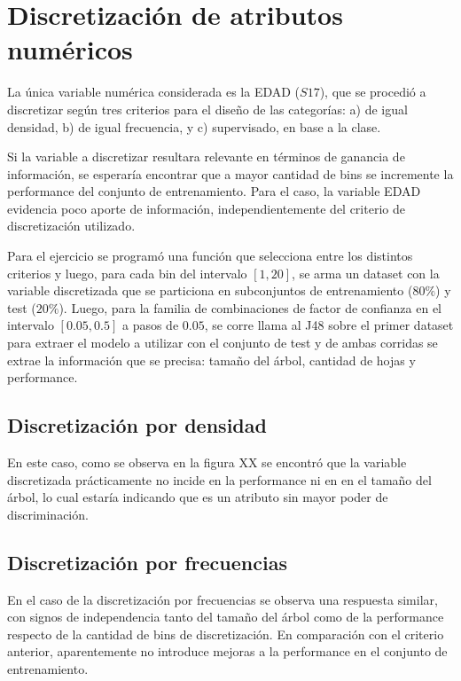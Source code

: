 \documentclass[]{article}
\begin{document}
\section{Discretización de atributos numéricos}
La única variable numérica considerada es la EDAD ($S17$), que se procedió a discretizar según tres criterios para el diseño de las categorías: a) de igual densidad, b) de igual frecuencia, y c) supervisado, en base a la clase.

Si la variable a discretizar resultara relevante en términos de ganancia de información, se esperaría encontrar que a mayor cantidad de bins se incremente la performance del conjunto de entrenamiento. Para el caso, la variable EDAD evidencia poco aporte de información, independientemente del criterio de discretización utilizado. 

Para el ejercicio se programó una función que selecciona entre los distintos criterios y luego, para cada bin del intervalo $[1,20]$, se arma un dataset con la variable discretizada que se particiona en subconjuntos de entrenamiento ($80\%$) y test ($20\%$). Luego, para la familia de combinaciones de factor de confianza en el intervalo $[0.05,0.5]$ a pasos de $0.05$, se corre llama al J48 sobre el primer dataset para extraer el modelo a utilizar con el conjunto de test y de ambas corridas se extrae la información que se precisa: tamaño del árbol, cantidad de hojas y performance.

\subsection{Discretización por densidad}

En este caso, como se observa en la figura XX se encontró que la variable discretizada prácticamente no incide en la performance ni en en el tamaño del árbol, lo cual estaría indicando que es un atributo sin mayor poder de discriminación.

\subsection{Discretización por frecuencias}

En el caso de la discretización por frecuencias se observa una respuesta similar, con signos de independencia tanto del tamaño del árbol como de la performance respecto de la cantidad de bins de discretización. En comparación con el criterio anterior, aparentemente no introduce mejoras a la performance en el conjunto de entrenamiento. 
\end{document}
